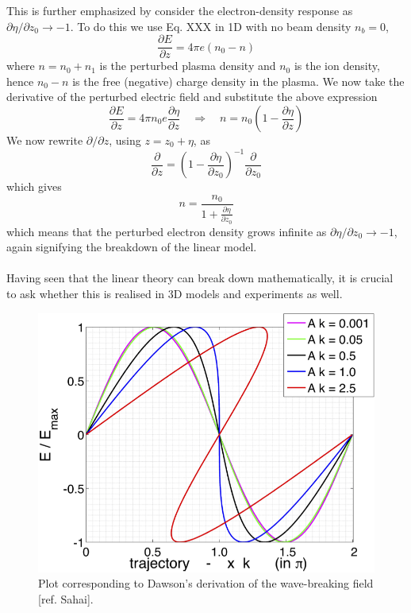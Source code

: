 This is further emphasized by consider the electron-density response as $\partial \eta/\partial z_0\to -1$. To do this we use  Eq. XXX in 1D with no beam density $n_b=0$, 
\begin{equation}
\frac{\partial E}{\partial z}=4\pi e(n_0-n)
\end{equation}
where $n=n_0+n_1$ is the perturbed plasma density and $n_0$ is the ion density, hence $n_0-n$ is the free (negative) charge density in the plasma. We now take the derivative of the perturbed electric field and substitute the above expression
\begin{equation}
\frac{\partial E}{\partial z}=4\pi n_0 e \frac{\partial \eta}{\partial z} \quad \Rightarrow \quad n=n_0\left(1-\frac{\partial \eta}{\partial z}\right)
\end{equation}
We now rewrite $\partial /\partial z$, using $z=z_0+\eta$, as
\begin{equation}
\frac{\partial}{\partial z}=\left(1-\frac{\partial \eta }{\partial z_0}\right)^{-1}\frac{\partial}{\partial z_0}
\end{equation}
which gives
\begin{equation}
n=\frac{n_0}{1+\frac{\partial \eta }{\partial z_0}}
 \end{equation} 
 which means that the perturbed electron density grows infinite as $\partial \eta/\partial z_0\to -1$, again signifying the breakdown of the linear model.\\
\\
Having seen that the linear theory can break down mathematically, it is crucial to ask whether this is realised in 3D models and experiments as well. 
\begin{figure}
\centering
\includegraphics[scale=1]{SahaiThesisPlot.png}
\caption{Plot corresponding to Dawson's derivation of the wave-breaking field [ref. Sahai].}
\label{DawsonCriterionPlot}
\end{figure}

